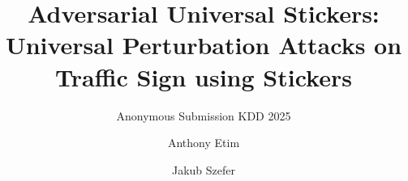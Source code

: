 \documentclass[sigconf]{acmart}
\begin{document}
\title{Adversarial Universal Stickers: Universal Perturbation Attacks on Traffic Sign using Stickers}

\ifanonymousversion
\author{Anonymous Submission KDD 2025}

\else

\author{Anthony Etim}

\author{Jakub Szefer}

\fi

\begin{abstract}
    
\end{abstract}

\maketitle

\pagestyle{plain}





















\end{document}
